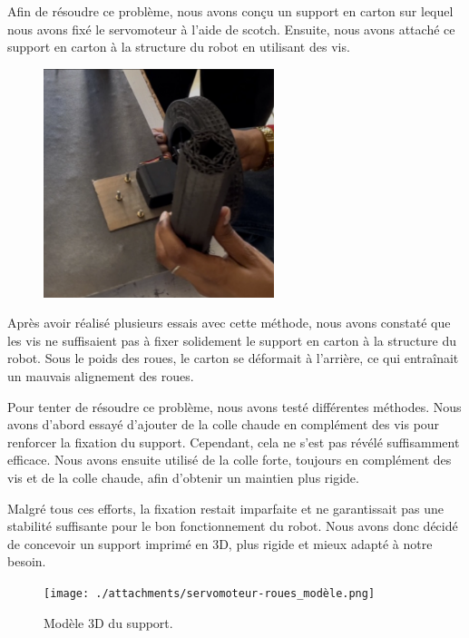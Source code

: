 \documentclass[a4paper,12pt]{report}  %
\begin{document}
Afin de résoudre ce problème, nous avons conçu un support en carton sur lequel nous avons fixé le servomoteur à l’aide de scotch. Ensuite, nous avons attaché ce support en carton à la structure du robot en utilisant des vis. 

\begin{figure}[H]
	\centering
	\includegraphics[width=0.6\textwidth]{./attachments/servomoteur-roues_vis.png}
	\caption{}
\end{figure}

Après avoir réalisé plusieurs essais avec cette méthode, nous avons constaté que les vis ne suffisaient pas à fixer solidement le support en carton à la structure du robot. Sous le poids des roues, le carton se déformait à l’arrière, ce qui entraînait un mauvais alignement des roues.

Pour tenter de résoudre ce problème, nous avons testé différentes méthodes. Nous avons d’abord essayé d’ajouter de la colle chaude en complément des vis pour renforcer la fixation du support. Cependant, cela ne s’est pas révélé suffisamment efficace. Nous avons ensuite utilisé de la colle forte, toujours en complément des vis et de la colle chaude, afin d’obtenir un maintien plus rigide.

Malgré tous ces efforts, la fixation restait imparfaite et ne garantissait pas une stabilité suffisante pour le bon fonctionnement du robot. Nous avons donc décidé de concevoir un support imprimé en 3D, plus rigide et mieux adapté à notre besoin.

\begin{figure}[H]
	\centering
	\texttt{[image: ./attachments/servomoteur-roues\_modèle.png]}
	\caption{Modèle 3D du support.}
\end{figure}
\end{document}
